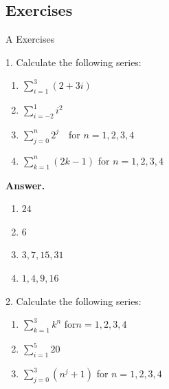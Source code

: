 \documentclass[10pt,]{book}
\theoremstyle{plain}
\theoremstyle{definition}
\theoremstyle{definition}
\theoremstyle{definition}
\theoremstyle{definition}
\begin{document}
\subsection[Exercises]{Exercises}\label{exercises-1-5}
\hypertarget{exercisegroup-9}{}\typeout{************************************************}
\typeout{************************************************}
A Exercises%
\begin{exercisegroup}
\item[1.]\hypertarget{exercise-32}{}Calculate the following series:%
\par
\leavevmode%
\begin{multicols}{2}
\begin{enumerate}[label=\alph*]
\item\hypertarget{li-220}{}  \(\sum_{i=1}^3 (2 + 3i)\)%
\item\hypertarget{li-221}{}  \(\sum_{i=-2}^1 i^2\) %
\item\hypertarget{li-222}{}  \(\sum_{j=0}^n 2^j\text{   }\) for \(n= 1, 2, 3, 4\)%
\item\hypertarget{li-223}{}  \(\sum_{k=1}^n (2k-1)\) for \(n = 1, 2, 3, 4\) %
\end{enumerate}
\end{multicols}
%
\par\smallskip
\par\smallskip
\noindent\textbf{Answer.}\hypertarget{answer-17}{}\quad
\leavevmode%
\begin{multicols}{2}
\begin{enumerate}[label=\alph*]
\item\hypertarget{li-224}{} \(24\)%
\item\hypertarget{li-225}{} \(6\)%
\item\hypertarget{li-226}{} \(3,7,15,31\)%
\item\hypertarget{li-227}{} \(1,4,9,16\)%
\end{enumerate}
\end{multicols}
%
\item[2.]\hypertarget{exercise-33}{} Calculate the following series: %
\par
\leavevmode%
\begin{enumerate}[label=\alph*]
\item\hypertarget{li-228}{}  \(\sum_{k=1}^3 k^n\) for\(n = 1, 2, 3, 4\) %
\item\hypertarget{li-229}{}  \(\sum_{i=1}^5 20\) %
\item\hypertarget{li-230}{}   \(\sum_{j=0}^3 \left(n^j+1\right)\) for \(n = 1, 2, 3,4\) %

\end{enumerate}
\end{exercisegroup}
\end{document}
